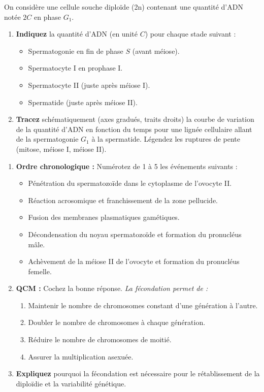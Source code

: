\documentclass[11pt]{article}
\begin{document}
\begin{exercice}
On considère une cellule souche diploïde (2n) contenant une quantité d'ADN notée $2C$ en phase $G_1$.
\begin{enumerate}
\item \textbf{Indiquez} la quantité d'ADN (en unité $C$) pour chaque stade suivant :
\begin{itemize}
\item Spermatogonie en fin de phase $S$ (avant méiose).
\item Spermatocyte I en prophase I.
\item Spermatocyte II (juste après méiose I).
\item Spermatide (juste après méiose II).
\end{itemize}
\item \textbf{Tracez} schématiquement (axes gradués, traits droits) la courbe de variation de la quantité d'ADN en fonction du temps pour une lignée cellulaire allant de la spermatogonie $G_1$ à la spermatide. Légendez les ruptures de pente (mitose, méiose I, méiose II).
\end{enumerate}
\end{exercice}

\begin{exercice}
\begin{enumerate}
\item \textbf{Ordre chronologique :} Numérotez de 1 à 5 les événements suivants :
\begin{itemize}
\item Pénétration du spermatozoïde dans le cytoplasme de l'ovocyte II.
\item Réaction acrosomique et franchissement de la zone pellucide.
\item Fusion des membranes plasmatiques gamétiques.
\item Décondensation du noyau spermatozoïde et formation du pronucléus mâle.
\item Achèvement de la méiose II de l'ovocyte et formation du pronucléus femelle.
\end{itemize}
\item \textbf{QCM :} Cochez la bonne réponse. \textit{La fécondation permet de :}
\begin{enumerate}
\item Maintenir le nombre de chromosomes constant d'une génération à l'autre.
\item Doubler le nombre de chromosomes à chaque génération.
\item Réduire le nombre de chromosomes de moitié.
\item Assurer la multiplication asexuée.
\end{enumerate}
\item \textbf{Expliquez} pourquoi la fécondation est nécessaire pour le rétablissement de la diploïdie et la variabilité génétique.
\end{enumerate}
\end{exercice}
\end{document}
